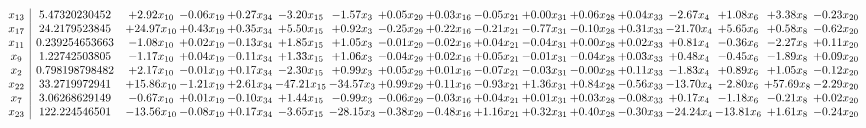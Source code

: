 \documentclass[9pt]{article}
\begin{document}
 \[\begin{array}{c| c c@{\hskip 2pt} c@{\hskip 2pt} c@{\hskip 2pt} c@{\hskip 2pt} c@{\hskip 2pt} c@{\hskip 2pt} c@{\hskip 2pt} c@{\hskip 2pt} c@{\hskip 2pt} c@{\hskip 2pt} c@{\hskip 2pt} c@{\hskip 2pt} c@{\hskip 2pt} c@{\hskip 2pt} c@{\hskip 2pt} }
 x_{13}   &  5.47320230452 & +  2.92 x_{10} & -0.06 x_{19} & +  0.27 x_{34} & -3.20 x_{15} & -1.57 x_{3} & +  0.05 x_{29} & +  0.03 x_{16} & -0.05 x_{21} & +  0.00 x_{31} & +  0.06 x_{28} & +  0.04 x_{33} & -2.67 x_{4} & +  1.08 x_{6} & +  3.38 x_{8} & -0.23 x_{20}\\
 x_{17}   &  24.2179523845 & + 24.97 x_{10} & +  0.43 x_{19} & +  0.35 x_{34} & +  5.50 x_{15} & +  0.92 x_{3} & -0.25 x_{29} & +  0.22 x_{16} & -0.21 x_{21} & -0.77 x_{31} & -0.10 x_{28} & +  0.31 x_{33} & -21.70 x_{4} & +  5.65 x_{6} & +  0.58 x_{8} & -0.62 x_{20}\\
 x_{11}   &  0.239254653663 & -1.08 x_{10} & +  0.02 x_{19} & -0.13 x_{34} & +  1.85 x_{15} & +  1.05 x_{3} & -0.01 x_{29} & -0.02 x_{16} & +  0.04 x_{21} & -0.04 x_{31} & +  0.00 x_{28} & +  0.02 x_{33} & +  0.81 x_{4} & -0.36 x_{6} & -2.27 x_{8} & +  0.11 x_{20}\\
 x_{9}   &  1.22742503805 & -1.17 x_{10} & +  0.04 x_{19} & -0.11 x_{34} & +  1.33 x_{15} & +  1.06 x_{3} & -0.04 x_{29} & +  0.02 x_{16} & +  0.05 x_{21} & -0.01 x_{31} & -0.04 x_{28} & +  0.03 x_{33} & +  0.48 x_{4} & -0.45 x_{6} & -1.89 x_{8} & +  0.09 x_{20}\\
 x_{2}   &  0.798198798482 & +  2.17 x_{10} & -0.01 x_{19} & +  0.17 x_{34} & -2.30 x_{15} & +  0.99 x_{3} & +  0.05 x_{29} & +  0.01 x_{16} & -0.07 x_{21} & -0.03 x_{31} & -0.00 x_{28} & +  0.11 x_{33} & -1.83 x_{4} & +  0.89 x_{6} & +  1.05 x_{8} & -0.12 x_{20}\\
 x_{22}   &  33.2719972941 & + 15.86 x_{10} & -1.21 x_{19} & +  2.61 x_{34} & -47.21 x_{15} & -34.57 x_{3} & +  0.99 x_{29} & +  0.11 x_{16} & -0.93 x_{21} & +  1.36 x_{31} & +  0.84 x_{28} & -0.56 x_{33} & -13.70 x_{4} & -2.80 x_{6} & + 57.69 x_{8} & -2.29 x_{20}\\
 x_{7}   &  3.06268629149 & -0.67 x_{10} & +  0.01 x_{19} & -0.10 x_{34} & +  1.44 x_{15} & -0.99 x_{3} & -0.06 x_{29} & -0.03 x_{16} & +  0.04 x_{21} & +  0.01 x_{31} & +  0.03 x_{28} & -0.08 x_{33} & +  0.17 x_{4} & -1.18 x_{6} & -0.21 x_{8} & +  0.02 x_{20}\\
 x_{23}   &  122.224546501 & -13.56 x_{10} & -0.08 x_{19} & +  0.17 x_{34} & -3.65 x_{15} & -28.15 x_{3} & -0.38 x_{29} & -0.48 x_{16} & +  1.16 x_{21} & +  0.32 x_{31} & +  0.40 x_{28} & -0.30 x_{33} & -24.24 x_{4} & -13.81 x_{6} & +  1.61 x_{8} & -0.24 x_{20}\\

\end{array}\]
\end{document}
